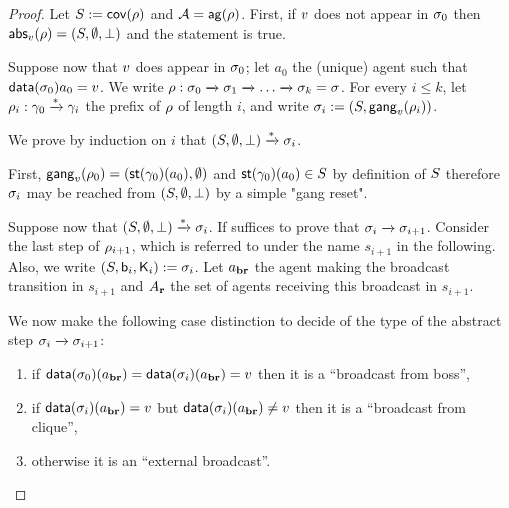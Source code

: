 \begin{proof}
Let $S := \mathsf{cov}(\rho)$ and $\mathcal{A} = \mathsf{ag}(\rho)$.
First, if $v$ does not appear in $\sigma_0$ then $\mathsf{abs}_{v}(\rho) = (S, \emptyset, \bot)$ and the statement is true.

Suppose now that $v$ does appear in $\sigma_0$; let $a_0$ the (unique) agent such that $\mathsf{data}(\sigma_0){a_0} = v$. We write $\rho : \sigma_0 \xrightarrow{} \sigma_1 \xrightarrow{} \dots \xrightarrow{} \sigma_k = \sigma$. For every $i \leq k$, let $\rho_i : \gamma_0 \xrightarrow{*} \gamma_i$ the prefix of $\rho$ of length $i$, and write $\sigma_i := (S, \mathsf{gang}_{v}(\rho_i))$. 

We prove by induction on $i$ that $(S, \emptyset, \bot) \xrightarrow{*} \sigma_i$.

First, $\mathsf{gang}_{v}(\rho_0) = (\mathsf{st}(\gamma_0)(a_0), \emptyset)$ and $\mathsf{st}(\gamma_0)(a_0) \in S$ by definition of $S$ therefore $\sigma_i$ may be reached from $(S, \emptyset, \bot)$ by a simple "gang reset".

Suppose now that $(S, \emptyset, \bot) \xrightarrow{*} \sigma_i$. 
If suffices to prove that $\sigma_i \xrightarrow{} \sigma_{i+1}$. Consider the last step of $\rho_{i+1}$, which is referred to under the name $s_{i+1}$ in the following. Also, we write $(S, \mathsf{b}_i, \mathsf{K}_i) := \sigma_i$. Let $a_{\textbf{br}}$ the agent making the broadcast transition in $s_{i+1}$ and $A_{\textbf{r}}$ the set of agents receiving this broadcast in $s_{i+1}$. 

We now make the following case distinction to decide of the type of the abstract step $\sigma_i \xrightarrow{} \sigma_{i+1}$:
\begin{enumerate}
\item\label{proof_soundess:case_broadcast_boss} if $\mathsf{data}(\sigma_0)(a_{\textbf{br}}) = \mathsf{data}(\sigma_{i})(a_{\textbf{br}}) = v$ then it is a ``broadcast from boss'',
\item\label{proof_soundess:case_broadcast_clique} if $\mathsf{data}(\sigma_{i})(a_{\textbf{br}}) = v$ but $\mathsf{data}(\sigma_{i})(a_{\textbf{br}}) \ne v$ then it is a ``broadcast from clique'',
\item\label{proof_soundess:case_external_broadcast} otherwise it is an ``external broadcast''. 
\end{enumerate}


\end{proof}
